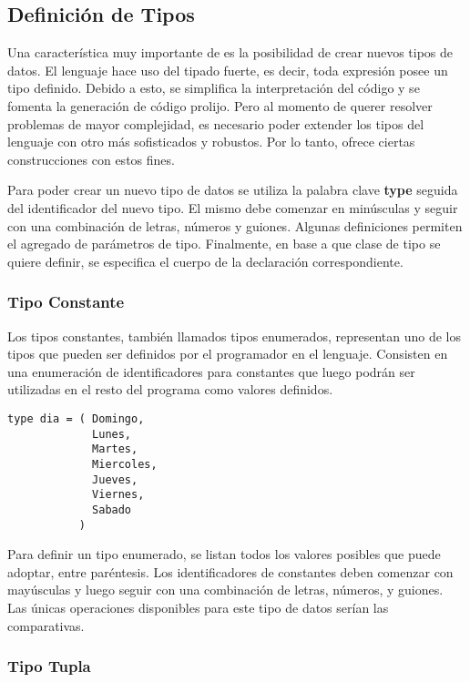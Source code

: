 \documentclass{article}
\begin{document}
\subsection{Definición de Tipos}

Una característica muy importante de \Lang\space es la posibilidad de crear nuevos tipos de datos.
El lenguaje hace uso del tipado fuerte, es decir, toda expresión posee un tipo definido.
Debido a esto, se simplifica la interpretación del código y se fomenta la generación de código prolijo.
Pero al momento de querer resolver problemas de mayor complejidad, es necesario poder extender los tipos del lenguaje con otro más sofisticados y robustos.
Por lo tanto, \Lang\space ofrece ciertas construcciones con estos fines.

Para poder crear un nuevo tipo de datos se utiliza la palabra clave \textbf{type} seguida del identificador del nuevo tipo.
El mismo debe comenzar en minúsculas y seguir con una combinación de letras, números y guiones.
Algunas definiciones permiten el agregado de parámetros de tipo.
Finalmente, en base a que clase de tipo se quiere definir, se especifica el cuerpo de la declaración correspondiente.

\subsubsection{Tipo Constante}

Los tipos constantes, también llamados tipos enumerados, representan uno de los tipos que pueden ser definidos por el programador en el lenguaje.
Consisten en una enumeración de identificadores para constantes que luego podrán ser utilizadas en el resto del programa como valores definidos.
\begin{lstlisting}
type dia = ( Domingo,
             Lunes,
             Martes,
             Miercoles,
             Jueves,
             Viernes,
             Sabado
           )
\end{lstlisting}

Para definir un tipo enumerado, se listan todos los valores posibles que puede adoptar, entre paréntesis.
Los identificadores de constantes deben comenzar con mayúsculas y luego seguir con una combinación de letras, números, y guiones.
Las únicas operaciones disponibles para este tipo de datos serían las comparativas.

\subsubsection{Tipo Tupla}
\end{document}

